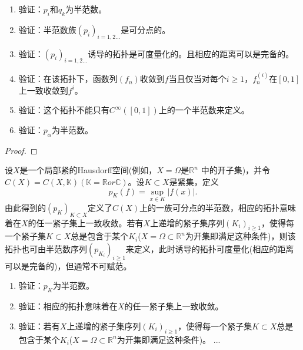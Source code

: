 \begin{proposition}
	\begin{enumerate}
		\item 验证：$p_{i}$和$q_{k}$为半范数。
		\item 验证：半范数族$(p_{i})_{i=1,2...}$是可分点的。
		\item 验证：$(p_{i})_{i=1,2...}$诱导的拓扑是可度量化的。且相应的距离可以是完备的。
		\item 验证：在该拓扑下，函数列$(f_{n})$收敛到$f$当且仅当对每个$i\geq 1$，$f_{n}^{(i)} $在$[0,1]$上一致收敛到$f^{i}$。
		\item 验证：这个拓扑不能只有$C^{\infty}([0,1])$上的一个半范数来定义。
		\item 验证：$p_{\alpha}$为半范数。
	\end{enumerate}
\end{proposition}

\begin{proof}
	
\end{proof}


\begin{example}
	设$X$是一个局部紧的Hausdorff空间(例如，$X=\Omega$是$\mathbb{R}^{n}$ 中的开子集)，并令$C(X)=C(X,\mathbb{K})(\mathbb{K}=\mathbb{R}or\mathbb{C})$。设$K\subset X $是紧集，定义
	\begin{equation*}
		p_{K}(f)=\sup_{x\in K}|f(x)|.
	\end{equation*}
	由此得到的$(p_{K})_{K\subset X}$定义了$C(X) $上的一族可分点的半范数，相应的拓扑意味着在$X$的任一紧子集上一致收敛。若有$X$上递增的紧子集序列$(K_{i})_{i\geq 1} $，使得每一个紧子集$K\subset X $总是包含于某个$K_{i}$($X=\Omega\subset \mathbb{R}^{n} $为开集即满足这种条件)，则该拓扑也可由半范数序列$(p_{K_{i}})_{i\geq 1}$来定义，此时诱导的拓扑可度量化(相应的距离可以是完备的)，但通常不可赋范。
\end{example}

\begin{proposition}
	\begin{enumerate}

	\item 验证：$p_{K}$为半范数。
	\item 验证：相应的拓扑意味着在$X$的任一紧子集上一致收敛。
	\item 验证：若有$X$上递增的紧子集序列$(K_{i})_{i\geq 1} $，使得每一个紧子集$K\subset X $总是包含于某个$K_{i}$($X=\Omega\subset \mathbb{R}^{n} $为开集即满足这种条件)。
	...
	\end{enumerate}
\end{proposition}

